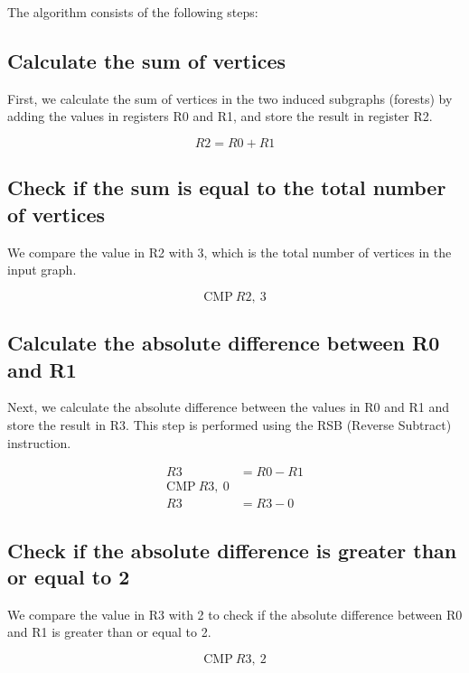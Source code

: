 The algorithm consists of the following steps:

\subsection{Calculate the sum of vertices}

First, we calculate the sum of vertices in the two induced subgraphs (forests) by adding the values in registers R0 and R1, and store the result in register R2.

\begin{equation}
    R2 = R0 + R1
\end{equation}

\subsection{Check if the sum is equal to the total number of vertices}

We compare the value in R2 with 3, which is the total number of vertices in the input graph.

\begin{equation}
    \text{CMP}\ R2,\ 3
\end{equation}

\subsection{Calculate the absolute difference between R0 and R1}

Next, we calculate the absolute difference between the values in R0 and R1 and store the result in R3. This step is performed using the RSB (Reverse Subtract) instruction.

\begin{align}
    R3 &= R0 - R1 \\
    \text{CMP}\ R3,\ 0 \\
    R3 &= R3 - 0
\end{align}

\subsection{Check if the absolute difference is greater than or equal to 2}

We compare the value in R3 with 2 to check if the absolute difference between R0 and R1 is greater than or equal to 2.

\begin{equation}
    \text{CMP}\ R3,\ 2
\end{equation}

